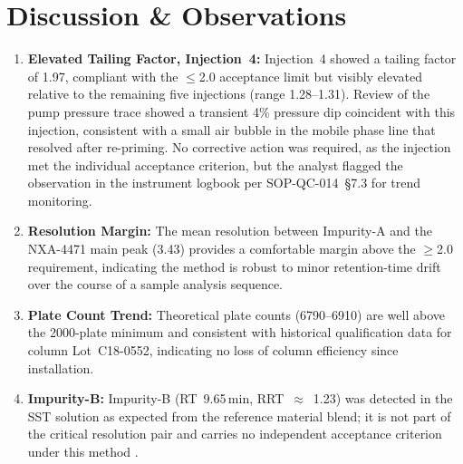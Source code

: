 \section{Discussion \& Observations}

\begin{enumerate}[leftmargin=1.2em,itemsep=2.0pt]
  \item \textbf{Elevated Tailing Factor, Injection~4:} Injection~4 showed a tailing factor of 1.97, compliant with the $\leq$2.0 acceptance limit but visibly elevated relative to the remaining five injections (range 1.28--1.31). Review of the pump pressure trace showed a transient 4\% pressure dip coincident with this injection, consistent with a small air bubble in the mobile phase line that resolved after re-priming. No corrective action was required, as the injection met the individual acceptance criterion, but the analyst flagged the observation in the instrument logbook per SOP-QC-014~\S7.3 for trend monitoring.
  \item \textbf{Resolution Margin:} The mean resolution between Impurity-A and the NXA-4471 main peak (3.43) provides a comfortable margin above the $\geq$2.0 requirement, indicating the method is robust to minor retention-time drift over the course of a sample analysis sequence.
  \item \textbf{Plate Count Trend:} Theoretical plate counts (6790--6910) are well above the 2000-plate minimum and consistent with historical qualification data for column Lot~C18-0552, indicating no loss of column efficiency since installation.
  \item \textbf{Impurity-B:} Impurity-B (RT~9.65\,min, RRT~$\approx$~1.23) was detected in the SST solution as expected from the reference material blend; it is not part of the critical resolution pair and carries no independent acceptance criterion under this method \cite{Dolan2002}.
\end{enumerate}

